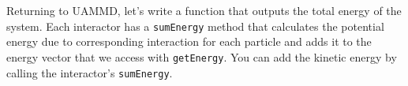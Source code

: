 Returning to UAMMD, let's write a function that outputs the total energy of the 
system. Each interactor has a \texttt{sumEnergy} method that calculates the 
potential energy due to corresponding interaction for each particle and adds it 
to the energy vector that we access with \texttt{getEnergy}. You can add the 
kinetic energy by calling the interactor's \texttt{sumEnergy}.

